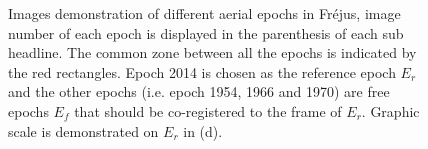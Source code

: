 \begin{figure}[htbp]
\begin{center}
{\begin{minipage}[t]{0.46\linewidth}
    \end{minipage}%
}
        \caption{Images demonstration of different aerial epochs in Fr{\'e}jus, image number of each epoch is displayed in the parenthesis of each sub headline. The common zone between all the epochs is indicated by the red rectangles. Epoch 2014 is chosen as the reference epoch $E_r$ and the other epochs (i.e. epoch 1954, 1966 and 1970) are free epochs $E_f$ that should be co-registered to the frame of $E_r$. Graphic scale is demonstrated on $E_r$ in (d).}
        \label{FrejusData}
    \end{center}
\end{figure} 


\begin{figure}[htbp]
    \begin{center}
\end{center}
\end{figure}
